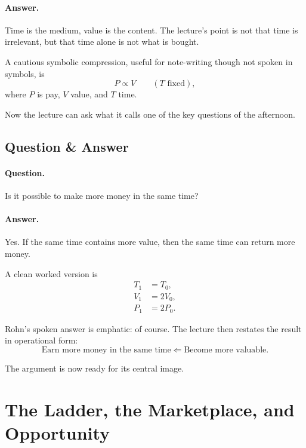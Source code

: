 \paragraph{Answer.} Time is the medium, value is the content. The lecture's point is not that time is irrelevant, but that time alone is not what is bought.

A cautious symbolic compression, useful for note-writing though not spoken in symbols, is
\begin{equation}
P \propto V \qquad (T \text{ fixed}),
\end{equation}
where \(P\) is pay, \(V\) value, and \(T\) time.

Now the lecture can ask what it calls one of the key questions of the afternoon.

\subsection{Question \& Answer}

\paragraph{Question.} Is it possible to make more money in the same time?

\paragraph{Answer.} Yes. If the same time contains more value, then the same time can return more money.

A clean worked version is
\begin{align}
T_{1} &= T_{0},\\
V_{1} &= 2V_{0},\\
P_{1} &= 2P_{0}.
\end{align}

Rohn's spoken answer is emphatic: of course. The lecture then restates the result in operational form:
\begin{equation}
\text{Earn more money in the same time} \Longleftarrow \text{Become more valuable}.
\end{equation}

The argument is now ready for its central image.

\section{The Ladder, the Marketplace, and Opportunity}

